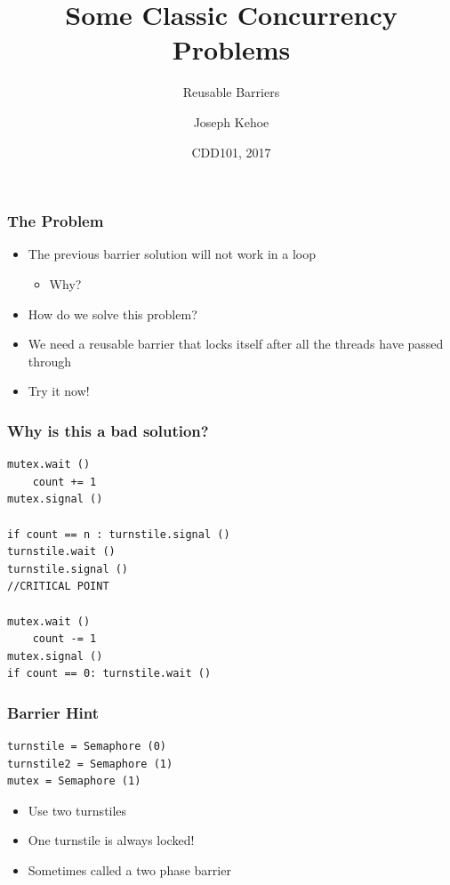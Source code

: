 \documentclass{beamer}
\title[Concurrency] %
{Some Classic Concurrency Problems}
\subtitle{Reusable Barriers}
\author[Dr. Joseph Kehoe] %
{Joseph Kehoe\inst{1}}
\institute[IT Carlow] %
{
	\inst{1}%
	Department of Computing and Networking\\
	Institute of Technology Carlow
}
\date[ITC 2017] %
{CDD101, 2017}
\begin{document}
 
\frame{\titlepage}
 
 

\begin{frame}
\frametitle{The Problem}
\begin{itemize}
\item The previous barrier solution will not work in a loop
	\begin{itemize}
	\item Why?
	\end{itemize}
\item How do we solve this problem?
\item We need a reusable barrier that locks itself after all the threads have passed through
\item Try it now!
\end{itemize}
\end{frame}


\begin{frame}[fragile]
\frametitle{Why is this a bad solution?}
\begin{verbatim}
mutex.wait ()
    count += 1
mutex.signal ()

if count == n : turnstile.signal ()
turnstile.wait ()
turnstile.signal ()
//CRITICAL POINT

mutex.wait ()
    count -= 1
mutex.signal ()
if count == 0: turnstile.wait ()
\end{verbatim}
\end{frame}


\begin{frame}[fragile]
	\frametitle{Barrier Hint}
\begin{verbatim}
turnstile = Semaphore (0)
turnstile2 = Semaphore (1)
mutex = Semaphore (1)
\end{verbatim}
\begin{itemize}
	\item Use two turnstiles
\item One turnstile is always locked!
\item Sometimes called a two phase barrier
\end{itemize}
\end{frame}
\end{document}
